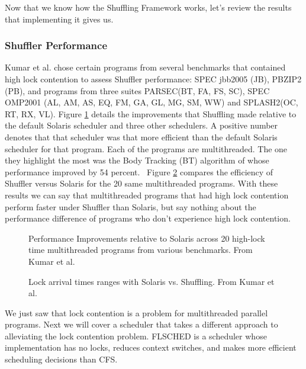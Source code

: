 \documentclass{sig-alternate}
\begin{document}
Now that we know how the Shuffling Framework works, let's review the results that implementing it gives us.

\subsubsection{Shuffler Performance}
\label{sec:shuf_performance}

Kumar et al. chose certain programs from several benchmarks that contained high lock contention to assess Shuffler performance: SPEC jbb2005 (JB), PBZIP2 (PB), and programs from three suites PARSEC(BT, FA, FS, SC), SPEC OMP2001 (AL, AM, AS, EQ, FM, GA, GL, MG, SM, WW) and SPLASH2(OC, RT, RX, VL). Figure \ref{fig:shuf_performance} details the improvements that Shuffling made relative to the default Solaris scheduler and three other schedulers. A positive number denotes that that scheduler was that more efficient than the default Solaris scheduler for that program. Each of the programs are multithreaded. The one they highlight the most was the Body Tracking (BT) algorithm of whose performance improved by 54 percent.~\cite{Kumar:2014} Figure \ref{fig:shuf_vs_solaris} compares the efficiency of Shuffler versus Solaris for the 20 same multithreaded programs. With these results we can say that multithreaded programs that had high lock contention perform faster under Shuffler than Solaris, but say nothing about the performance difference of programs who don't experience high lock contention.
\begin{figure}
\centering
{}
\caption{Performance Improvements relative to Solaris across 20 high-lock time multithreaded programs from various benchmarks. From Kumar et al.~\cite{Kumar:2014}}
\label{fig:shuf_performance}
\end{figure}

\begin{figure}
\centering
{}
\caption{Lock arrival times ranges with Solaris vs. Shuffling. From Kumar et al.~\cite{Kumar:2014}}
\label{fig:shuf_vs_solaris}
\end{figure}

We just saw that lock contention is a problem for multithreaded parallel programs. Next we will cover a scheduler that takes a different approach to alleviating the lock contention problem. FLSCHED is a scheduler whose implementation has no locks, reduces context switches, and makes more efficient scheduling decisions than CFS.~\cite{Jo:2017}
\end{document}
